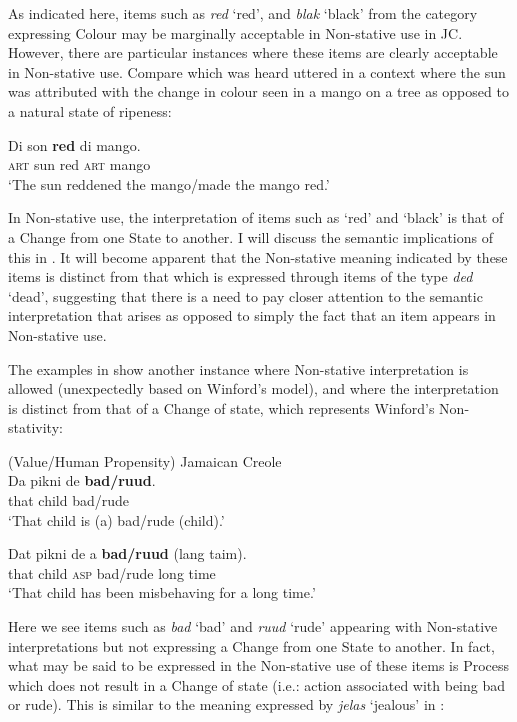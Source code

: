As indicated here, items such as \textit{red} `red', and \textit{blak}
 `black' from the category expressing Colour may be marginally
acceptable in Non-stative use in JC. However, there are particular
instances where these items are clearly acceptable in Non-stative use.
Compare  which was heard uttered in a context where
the sun was attributed with the change in colour seen in a mango on a
tree as opposed to a natural state of ripeness:

\ea%
\label{ex:3:28d}
\gll Di    son \textbf{red} di mango.\\
\textsc{art} sun  red \textsc{art} mango  \\
\glt `The sun reddened the mango\slash made the mango red.' \z

In Non-stative use, the interpretation of items such as ‘red’ and
 `black' is that of a Change from one State to another.  I will discuss
the semantic implications of this in .  It will become
apparent that the Non-stative meaning indicated by these items is
distinct from that which is expressed through items of the type
\textit{ded} `dead', suggesting that there is a need to pay closer
attention to the semantic interpretation that arises as opposed to
simply the fact that an item appears in Non-stative use.

The examples in  show another instance where Non-stative
interpretation is allowed (unexpectedly based on Winford’s model), and
where the interpretation is distinct from that of a Change of state,
which represents Winford’s Non-stativity:

\ea%
\label{ex:3:29}
(Value\slash Human Propensity)  Jamaican Creole\\
\ea
\gll Da pikni      de      \textbf{bad/ruud}. \\
		that child {\DEM} bad/rude      \\
\glt `That child is (a) bad\slash rude (child).'

\ex
\gll Dat pikni     de                       a       \textbf{bad/ruud}        (lang taim).\\
  		that child {\DEM} \textsc{asp} bad/rude {\db}long time  \\
\glt `That child has been misbehaving for a long time.' \z \z

Here we see items such as \textit{bad} `bad' and \textit{ruud} `rude'
appearing with Non-stative interpretations but not expressing a Change
from one State to another.  In fact, what may be said to be expressed
in the Non-stative use of these items is Process which does not result
in a Change of state (i.e.: action associated with being bad or rude).
This is similar to the meaning expressed by \textit{jelas} `jealous'
in :

